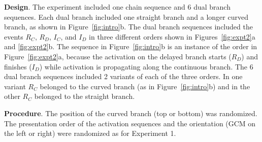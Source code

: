 \documentclass[10pt,letterpaper]{article}
\newcommand{\ev}[2]{$#1_#2$}
\begin{document}
\textbf{Design}. 
The experiment included one chain sequence and 6 dual branch sequences. Each dual branch included one straight branch and a longer curved branch, as shown in Figure~\ref{fig:intro}b. The dual branch sequences included the events \ev{R}{C}, \ev{R}{D}, \ev{I}{C}, and \ev{I}{D} in three different orders shown in Figures~\ref{fig:expt2}a and \ref{fig:expt2}b. The sequence in Figure~\ref{fig:intro}b is an instance of the order in Figure~\ref{fig:expt2}a, because the activation on the delayed branch starts (\ev{R}{D}) and finishes (\ev{I}{D}) while activation is propagating along the continuous branch. The 6 dual branch sequences included 2 variants of each of the three orders. In one variant \ev{R}{C} belonged to the curved branch (as in Figure~\ref{fig:intro}b) and in the other \ev{R}{C} belonged to the straight branch. 



\textbf{Procedure}. 
The position of the curved branch (top or bottom) was randomized. The presentation order of the activation sequences and the orientation (GCM on the left or right) were randomized as for Experiment 1.

\end{document}
